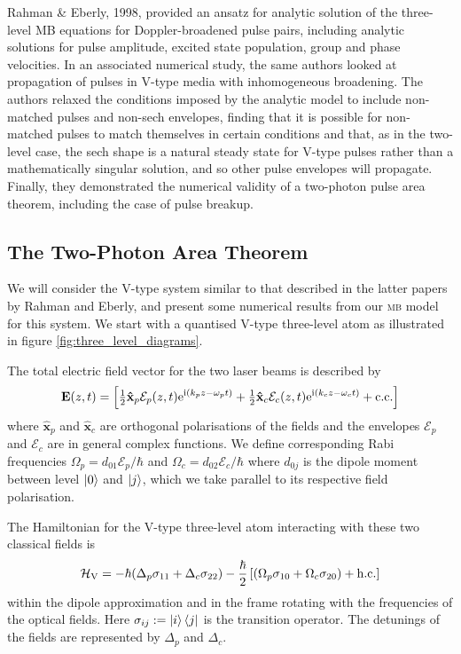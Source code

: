     Rahman \& Eberly, 1998, provided\cite{Rahman1998} an ansatz for analytic
    solution of the three-level MB equations for Doppler-broadened pulse pairs,
    including analytic solutions for pulse amplitude, excited state population,
    group and phase velocities. In an associated numerical study, the same
    authors looked at\cite{Rahman1999} propagation of pulses in V-type media
    with inhomogeneous broadening. The authors relaxed the conditions imposed by
    the analytic model to include non-matched pulses and non-sech envelopes,
    finding that it is possible for non-matched pulses to match themselves in
    certain conditions and that, as in the two-level case, the sech shape is a
    natural steady state for V-type pulses rather than a mathematically singular
    solution, and so other pulse envelopes will propagate. Finally, they
    demonstrated the numerical validity of a two-photon pulse area theorem,
    including the case of pulse breakup.

  \subsection{The Two-Photon Area Theorem}

    We will consider the V-type system similar to that described in the latter
    papers by Rahman and Eberly\cite{Rahman1999}, and present some numerical
    results from our \textsc{mb} model for this system. We start with a
    quantised V-type three-level atom as illustrated in figure
    \ref{fig:three_level_diagrams}.

    The total electric field vector for the two laser beams is described by
    \begin{equation}\label{eqn:env_carrier}
      \mathbf{E}(z,t) = \left[ \tfrac{1}{2} \mathbf{\hat{x}}_p 
        \mathcal{E}_p(z,t) \mathrm{e}^{\mathrm{i}(k_p z - \omega_p t)} + 
        \tfrac{1}{2} \mathbf{\hat{x}}_c \mathcal{E}_c(z,t) \mathrm{e}^{\mathrm{i}(k_c z -
        \omega_c t)} + \mathrm{c.c.} \right]
    \end{equation}
    where $\mathbf{\hat{x}}_p$ and $\mathbf{\hat{x}}_c$ are orthogonal
    polarisations of the fields and the envelopes $\mathcal{E}_p$ and
    $\mathcal{E}_c$ are in general complex functions. We define corresponding
    Rabi frequencies $\Omega_p = d_{01}\mathcal{E}_p/\hbar$ and $\Omega_c =
    d_{02}\mathcal{E}_c/\hbar$ where $d_{0j}$ is the dipole moment between level
    $\Ket{0}$ and $\Ket{j}$, which we take parallel to its respective field
    polarisation.

    The Hamiltonian for the V-type three-level atom interacting with these two 
    classical fields is
    \begin{equation}\label{eqn:vee_hamiltonian}
      \mathcal{H}_\mathrm{V} = -\hbar (\Delta_p \sigma_{11} + \Delta_c 
      \sigma_{22}) -\frac{\hbar}{2} 
      \left[ (\Omega_p \sigma_{10} + \Omega_c \sigma_{20} )
      + \mathrm{h.c.} \right]
    \end{equation}
    within the dipole approximation and in the frame rotating with the
    frequencies of the optical fields. Here $\sigma_{ij} := \Ket{i}\Bra{j}$ is
    the transition operator. The detunings of the fields are represented by
    $\Delta_p$ and $\Delta_c$.

